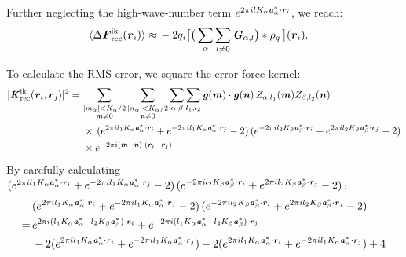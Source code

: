 \documentclass[aps,pre,preprint,unsortedaddress]{revtex4}
\renewcommand{\v}[1]{\textbf{\textit{#1}}}
\begin{document}
Further neglecting the
high-wave-number term $e^{2\pi i l K_\alpha\v a^\ast_\alpha\cdot \v r_i}$, we reach:
\begin{align}
  \langle\Delta\v F^{\textrm{ik}}_{\textrm{rec}}(\v r_i)\rangle
  \approx\,&
  -2q_i
  \big[
  \big(
  \sum_{\alpha}\sum_{l\neq 0}\v G_{\alpha,l}
  \big)
  \ast\rho_q\,
  \big] (\v r_i).
\end{align}

To calculate the RMS error, we square the error force kernel:
\begin{align}\nonumber
  \vert\v K^{\textrm{ik}}_{\textrm{rec}}(\v r_i,\v r_j)\vert^2
  =\,&
  \sum_{
    \begin{subarray}{c}
      \vert m_{\alpha}\vert < K_\alpha/2\\
      \v m\neq 0
    \end{subarray}}
  \sum_{
    \begin{subarray}{c}
      \vert n_{\alpha}\vert < K_\alpha/2\\
      \v n\neq 0
    \end{subarray}}
  \sum_{\alpha,\beta}
  \sum_{l_1,l_2}
  \v g(\v m)\cdot\v g(\v n)\,
  Z_{\alpha,l_1}(\v m)Z_{\beta,l_2}(\v n)
  \\\nonumber
  &\,
  \times
  \,(
  e^{2\pi i l_1 K_\alpha\v a^\ast_\alpha\cdot \v r_i} +
  e^{-2\pi i l_1 K_\alpha\v a^\ast_\alpha\cdot \v r_j}
  - 2
  )
  \,(
  e^{-2\pi i l_2 K_\beta\v a^\ast_\beta\cdot \v r_i} +
  e^{2\pi i l_2 K_\beta\v a^\ast_\beta\cdot \v r_j}
  - 2
  )\\
  &\,
  \times
  e^{-2\pi i(\v m-\v n)\cdot(\v r_i-\v r_j)}
\end{align}
By  carefully calculating
$  (
e^{2\pi i l_1 K_\alpha\v a^\ast_\alpha\cdot \v r_i} +
e^{-2\pi i l_1 K_\alpha\v a^\ast_\alpha\cdot \v r_j}
- 2
)
\,(
e^{-2\pi i l_2 K_\beta\v a^\ast_\beta\cdot \v r_i} +
e^{2\pi i l_2 K_\beta\v a^\ast_\beta\cdot \v r_j}
- 2
)$:
\begin{align}\nonumber
  &(
  e^{2\pi i l_1 K_\alpha\v a^\ast_\alpha\cdot \v r_i} +
  e^{-2\pi i l_1 K_\alpha\v a^\ast_\alpha\cdot \v r_j}
  - 2
  )
  \,(
  e^{-2\pi i l_2 K_\beta\v a^\ast_\beta\cdot \v r_i} +
  e^{2\pi i l_2 K_\beta\v a^\ast_\beta\cdot \v r_j}
  - 2
  ) \\ \nonumber
  = \,&
  e^{2\pi i(l_1K_\alpha\v a^\ast_\alpha - l_2K_\beta\v a^\ast_\beta)\cdot\v r_i} +
  e^{-2\pi i(l_1K_\alpha\v a^\ast_\alpha - l_2K_\beta\v a^\ast_\beta)\cdot\v r_j} \\
  \label{eqn:ik.cal.tmp1}
  &-2(
  e^{2\pi i l_1 K_\alpha\v a^\ast_\alpha\cdot \v r_i} +
  e^{-2\pi i l_1 K_\alpha\v a^\ast_\alpha\cdot \v r_j}
  ) 
  -2(
  e^{2\pi i l_1 K_\alpha\v a^\ast_\alpha\cdot \v r_i} +
  e^{-2\pi i l_1 K_\alpha\v a^\ast_\alpha\cdot \v r_j}
  ) + 4
\end{align}
\end{document}
